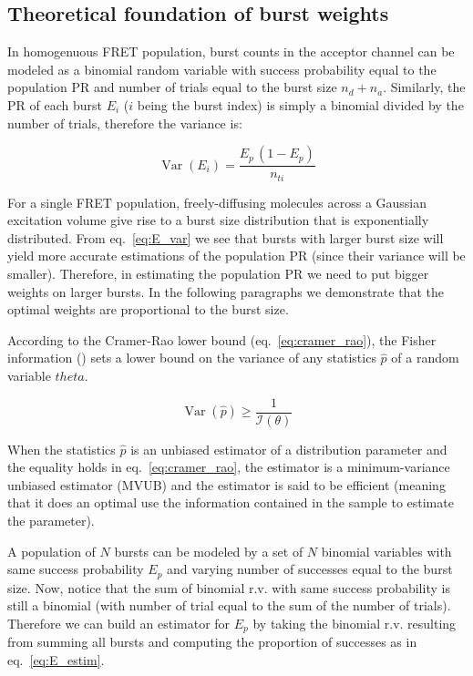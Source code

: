 \subsection{Theoretical foundation of burst weights}
\label{sec:burstweights_theory}
In homogenuous FRET population, burst counts in the acceptor channel can be
modeled as a binomial random variable with success probability equal to the
population PR and number of trials equal to the burst size $n_d + n_a$.
Similarly, the PR of each burst $E_i$ ($i$ being the burst index) is simply a binomial divided by the 
number of trials, therefore the variance is:

\begin{equation}
\label{eq:E_var}
\operatorname{Var} (E_i) = \frac{E_p\,(1 - E_p)}{n_{ti}}
\end{equation}

For a single FRET population, freely-diffusing molecules across 
a Gaussian excitation volume give rise to 
a burst size distribution that is exponentially distributed.
From eq.~\ref{eq:E_var} we see that bursts with larger burst size
will yield more accurate estimations of the population PR
(since their variance will be smaller). Therefore, in estimating the 
population PR we need to put bigger weights on larger bursts.
In the following paragraphs we demonstrate that the optimal weights
are proportional to the burst size.

According to the Cramer-Rao lower bound (eq.~\ref{eq:cramer_rao}), the 
Fisher information (\theta) sets a lower bound on the
variance of any statistics $\hat{p}$ of a random variable $theta$.

\begin{equation}
\label{eq:cramer_rao}
\operatorname{Var}\left(\hat{p}\right) \ge \frac{1}{\mathcal{I}(\theta)}
\end{equation}

When the statistics $\hat{p}$ is an unbiased estimator of a distribution 
parameter and the equality holds in eq.~\ref{eq:cramer_rao},
the estimator is a minimum-variance unbiased estimator (MVUB)
and the estimator is said to be efficient (meaning that it does an
optimal use the information contained in the sample to estimate the
parameter).

A population of $N$ bursts can be modeled by a set of $N$ binomial
variables with same success probability $E_p$ and varying number of successes
equal to the burst size. Now, notice that the sum of binomial r.v. with same 
success probability is still a binomial (with number of trial equal to the sum of the number of trials).
Therefore we can build an estimator for $E_p$ by taking the binomial r.v. resulting from summing all bursts
and computing the proportion of successes as in eq.~\ref{eq:E_estim}.

